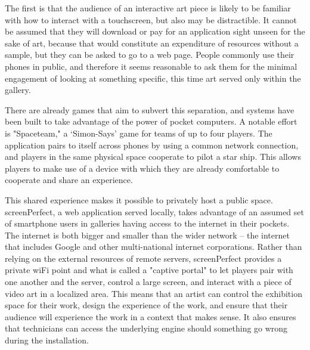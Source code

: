 The first is that the audience of an interactive art piece is likely to be familiar with how to interact with a touchscreen, but also may be distractible. It cannot be assumed that they will download or pay for an application sight unseen for the sake of art, because that would constitute an expenditure of resources without a sample, but they can be asked to go to a web page. People commonly use their phones in public, and therefore it seems reasonable to ask them for the minimal engagement of looking at something specific, this time art served only within the gallery. 

There are already games that aim to subvert this separation, and systems have been built to take advantage of the power of pocket computers. A notable effort is "Spaceteam," \parencite{spaceteam} a ‘Simon-Says' game for teams of up to four players. The application pairs to itself across phones by using a common network connection, and players in the same physical space cooperate to pilot a star ship. This allows players to make use of a device with which they are already comfortable to cooperate and share an experience.

This shared experience makes it possible to privately host a public space. screenPerfect, a web application served locally, takes advantage of an assumed set of smartphone users in galleries having access to the internet in their pockets. The internet is both bigger and smaller than the wider network – the internet that includes Google and other multi-national internet corporations. Rather than relying on the external resources of remote servers, screenPerfect provides a private wiFi point and what is called a "captive portal" to let players pair with one another and the server, control a large screen, and interact with a piece of video art in a localized area. This means that an artist can control the exhibition space for their work, design the experience of the work, and ensure that their audience will experience the work in a context that makes sense. It also ensures that technicians can access the underlying engine should something go wrong during the installation.

